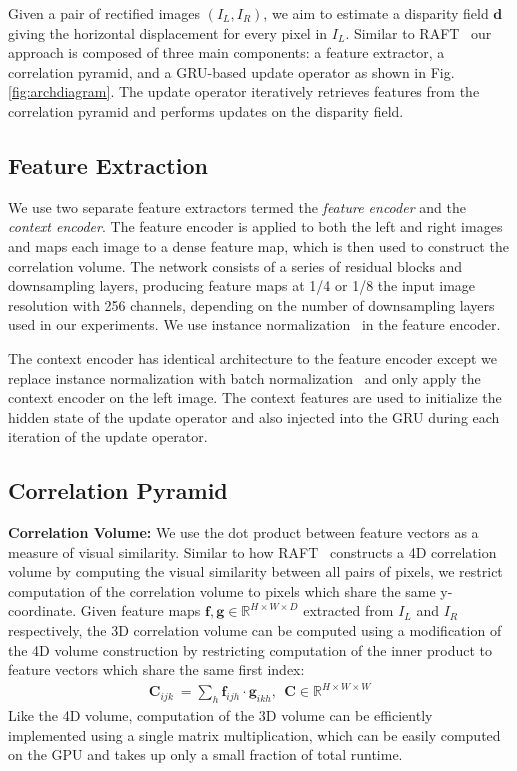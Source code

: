 \documentclass[10pt,twocolumn,letterpaper]{article}
\begin{document}
Given a pair of rectified images $(I_L, I_R)$, we aim to estimate a disparity field $\mathbf{d}$ giving the horizontal displacement for every pixel in $I_L$. Similar to RAFT~\cite{teed2020raft} our approach is composed of three main components: a feature extractor, a correlation pyramid, and a GRU-based update operator as shown in Fig. \ref{fig:archdiagram}. The update operator iteratively retrieves features from the correlation pyramid and performs updates on the disparity field.

\subsection{Feature Extraction}
We use two separate feature extractors termed the \emph{feature encoder} and the \emph{context encoder}. The feature encoder is applied to both the left and right images and maps each image to a dense feature map, which is then used to construct the correlation volume. The network consists of a series of residual blocks and downsampling layers, producing feature maps at 1/4 or 1/8 the input image resolution with 256 channels, depending on the number of downsampling layers used in our experiments. We use instance normalization~\cite{ulyanov2016instance} in the feature encoder. 

The context encoder has identical architecture to the feature encoder except we replace instance normalization with batch normalization~\cite{ioffe2015batch} and only apply the context encoder on the left image. The context features are used to initialize the hidden state of the update operator and also injected into the GRU during each iteration of the update operator.

\subsection{Correlation Pyramid}

\noindent \textbf{Correlation Volume:} We use the dot product between feature vectors as a measure of visual similarity. Similar to how RAFT~\cite{teed2020raft} constructs a 4D correlation volume by computing the visual similarity between all pairs of pixels, we restrict computation of the correlation volume to pixels which share the same y-coordinate. Given feature maps $\mathbf{f}, \mathbf{g} \in \mathbb{R}^{H \times W \times D}$ extracted from $I_L$ and $I_R$ respectively, the 3D correlation volume can be computed using a modification of the 4D volume construction by restricting computation of the inner product to feature vectors which share the same first index:
\begin{equation}
\begin{split}
\mathbf{C}_{ijk} \ = \sum_h \mathbf{f}_{ijh} \cdot \mathbf{g}_{ikh}, \ \ \mathbf{C} \in \mathbb{R}^{H \times W \times W}
\end{split}
\end{equation}
Like the 4D volume, computation of the 3D volume can be efficiently implemented using a single matrix multiplication, which can be easily computed on the GPU and takes up only a small fraction of total runtime. 
\end{document}
